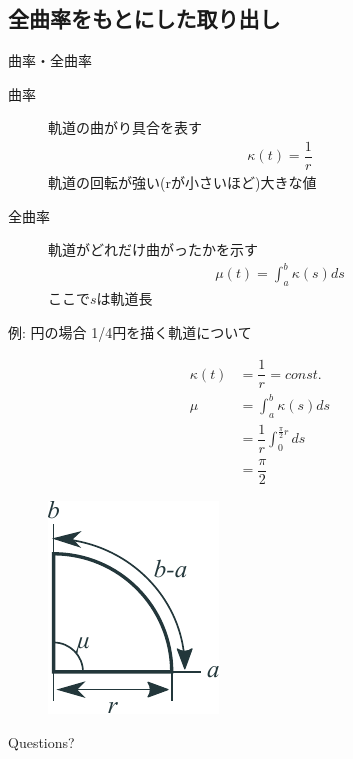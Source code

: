 \documentclass[12pt, xetex, xcolor=pdftex, dvipsnames]{beamer}
\begin{document}
\subsection{全曲率をもとにした取り出し}
\begin{frame}{曲率・全曲率}
  \begin{description}
    \item[曲率] 軌道の曲がり具合を表す
    \begin{align}
      \kappa(t) = \dfrac{1}{r}
    \end{align}
      軌道の回転が強い(rが小さいほど)大きな値
    \item[全曲率] 軌道がどれだけ曲がったかを示す
    \begin{align}
      \mu(t) = \int_a^b \kappa(s)ds
    \end{align}
    ここで$s$は軌道長
  \end{description}
\end{frame}
\begin{frame}{例: 円の場合}
  1/4円を描く軌道について
  \begin{minipage}{0.5\hsize}
    \begin{align}
      \kappa(t) &= \dfrac{1}{r} = const.\\
      \mu &= \int_a^b\kappa(s)ds \\
      &= \dfrac{1}{r}\int_0^{\frac{\pi}{2}r}ds\\
      &= \dfrac{\pi}{2}
    \end{align}
  \end{minipage}%
  \begin{minipage}{0.5\hsize}
    \begin{figure}
      \centering
      \includegraphics{img/curvature.pdf}
    \end{figure}
  \end{minipage}
\end{frame}

\begin{frame}[standout]
  Questions?
\end{frame}
\end{document}
